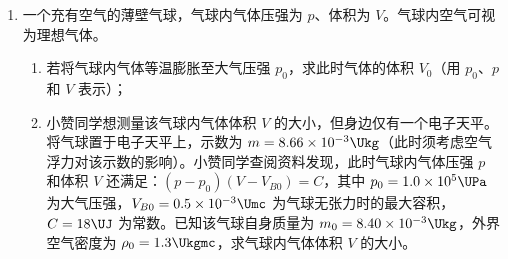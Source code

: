 \documentclass[\gkver]{gaokaozhenti}
\begin{document}
\begin{enumerate}
{\begin{enumerate}
	\item
	无作答要求

	\item
	无作答要求

	\item
	描点连线，如图（见详解）

	\item
	线性的

	\item
	0.120

	\item
	负方向

\end{enumerate}
}

\item
一个充有空气的薄壁气球，气球内气体压强为 $p$、体积为 $V$。气球内空气可视为理想气体。
\begin{enumerate}
	\item
	若将气球内气体等温膨胀至大气压强 $p_{0}$，求此时气体的体积 $V_{0}$（用 $p_{0}$、$p$ 和 $V$ 表示）；
	\item
	小赞同学想测量该气球内气体体积 $V$ 的大小，但身边仅有一个电子天平。将气球置于电子天平上，示数为 $m = 8.66\times10^{-3} \Ukg$（此时须考虑空气浮力对该示数的影响）。小赞同学查阅资料发现，此时气球内气体压强 $p$ 和体积 $V$ 还满足：$(p - p_{0})(V - V_{B0}) = C$，其中 $p_{0} = 1.0\times10^{5} \UPa$ 为大气压强，$V_{B0} = 0.5\times10^{-3} \Umc$ 为气球无张力时的最大容积，$C = 18 \UJ$ 为常数。已知该气球自身质量为 $m_{0} = 8.40\times10^{-3} \Ukg$，外界空气密度为 $\rho_{0} = 1.3 \Ukgmc$，求气球内气体体积 $V$ 的大小。
\end{enumerate}

\end{enumerate}
\end{document}
